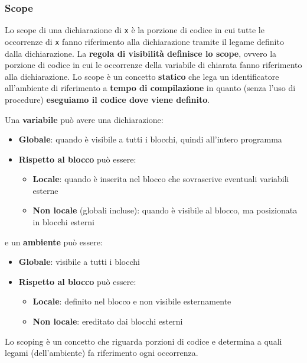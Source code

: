 \documentclass[a4paper]{article}
\begin{document}
\subsubsection{Scope}
Lo scope di una dichiarazione di \texttt{x} è la porzione di codice in cui tutte
le occorrenze di \texttt{x} fanno riferimento alla dichiarazione tramite il legame
definito dalla dichiarazione.
La \textbf{regola di visibilità definisce lo scope}, ovvero la porzione di codice
in cui le occorrenze della variabile di chiarata fanno riferimento alla dichiarazione.
Lo scope è un concetto \textbf{statico} che lega un identificatore all'ambiente
di riferimento a \textbf{tempo di compilazione} in quanto (senza l'uso di procedure)
\textbf{eseguiamo il codice dove viene definito}.

\vspace{1em}
\noindent
Una \textbf{variabile} può avere una dichiarazione:
\begin{itemize}
  \item \textbf{Globale}: quando è visibile a tutti i blocchi, quindi all'intero
    programma

  \item \textbf{Rispetto al blocco} può essere:
    \begin{itemize}
      \item \textbf{Locale}: quando è inserita nel blocco che sovrascrive eventuali
        variabili esterne
      \item \textbf{Non locale} (globali incluse): quando è visibile al blocco, ma
        posizionata in blocchi esterni
    \end{itemize}
\end{itemize}
e un \textbf{ambiente} può essere:
\begin{itemize}
  \item \textbf{Globale}: visibile a tutti i blocchi
  \item \textbf{Rispetto al blocco} può essere:
    \begin{itemize}
      \item \textbf{Locale}: definito nel blocco e non visibile esternamente
      \item \textbf{Non locale}: ereditato dai blocchi esterni
    \end{itemize}
\end{itemize}

\vspace{1em}
\noindent
Lo scoping è un concetto che riguarda porzioni di codice e determina a quali legami
(dell'ambiente) fa riferimento ogni occorrenza.
\end{document}

